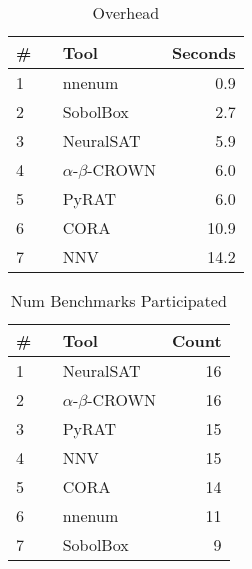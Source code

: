 


\begin{table}[h]
\begin{center}
\caption{Overhead} \label{tab:overhead}
{\setlength{\tabcolsep}{2pt}
\begin{tabular}[h]{@{}llr@{}}
\toprule
\textbf{\# ~} & \textbf{Tool} & \textbf{Seconds}\\
\midrule
1 & nnenum & 0.9 \\
2 & SobolBox & 2.7 \\
3 & NeuralSAT & 5.9 \\
4 & $\alpha$-$\beta$-CROWN & 6.0 \\
5 & PyRAT & 6.0 \\
6 & CORA & 10.9 \\
7 & NNV & 14.2 \\
\bottomrule
\end{tabular}
}
\end{center}
\end{table}




\begin{table}[h]
\begin{center}
\caption{Num Benchmarks Participated} \label{tab:stats0}
{\setlength{\tabcolsep}{2pt}
\begin{tabular}[h]{@{}llr@{}}
\toprule
\textbf{\# ~} & \textbf{Tool} & \textbf{Count}\\
\midrule
1 & NeuralSAT & 16 \\
2 & $\alpha$-$\beta$-CROWN & 16 \\
3 & PyRAT & 15 \\
4 & NNV & 15 \\
5 & CORA & 14 \\
6 & nnenum & 11 \\
7 & SobolBox & 9 \\
\bottomrule
\end{tabular}
}
\end{center}
\end{table}




